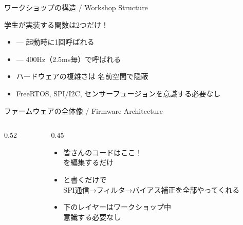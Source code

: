 \begin{frame}{ワークショップの構造 / Workshop Structure}
  \begin{block}{学生が実装する関数は2つだけ！}
    \begin{itemize}
      \item {} --- 起動時に1回呼ばれる
      \item {} --- 400Hz（2.5ms毎）で呼ばれる
    \end{itemize}
  \end{block}

  \vspace{0.5em}

  \begin{itemize}
    \item ハードウェアの複雑さは  名前空間で隠蔽
    \item FreeRTOS, SPI/I2C, センサーフュージョンを意識する必要なし
  \end{itemize}
\end{frame}

\begin{frame}{ファームウェアの全体像 / Firmware Architecture}
  \begin{columns}[T]
    \begin{column}{0.52\textwidth}
      \centering
      \vspace{-2mm}
      \resizebox{0.95\columnwidth}{!}{}
    \end{column}
    \begin{column}{0.45\textwidth}
      \footnotesize
      \begin{itemize}\setlength{\itemsep}{4pt}
        \item 皆さんのコードはここ！\\
               を編集するだけ
        \item {} と書くだけで\\
              SPI通信→フィルタ→バイアス補正を全部やってくれる
        \item 下のレイヤーはワークショップ中\\
              意識する必要なし
      \end{itemize}
    \end{column}
  \end{columns}
\end{frame}

